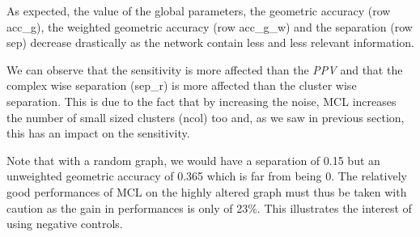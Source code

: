 As expected, the value of the global parameters, the geometric accuracy (row acc\_g), the weighted geometric accuracy (row acc\_g\_w) and the separation (row sep) decrease drastically as the network contain less and less relevant information.

We can observe that the sensitivity is more affected than the \textit{PPV} and that the complex wise separation (sep\_r) is more affected than the cluster wise separation. This is due to the fact that by increasing the noise, MCL increases the number of small sized clusters (ncol) too and, as we saw in previous section, this has an impact on the sensitivity.

Note that with a random graph, we would have a separation of 0.15 but an unweighted geometric accuracy of 0.365 which is far from being 0. The relatively good performances of MCL on the highly altered graph must thus be taken with caution as the gain in performances is only of 23\%. This illustrates the interest of using negative controls.